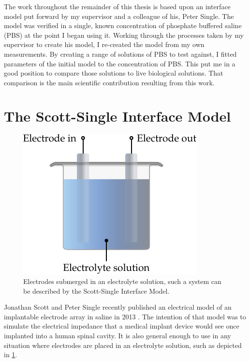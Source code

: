 
The work throughout the remainder of this thesis is based upon an interface model put forward by my supervisor and a colleague of his, Peter Single.
The model was verified in a single, known concentration of phosphate buffered saline (PBS) at the point I began using it.
Working through the processes taken by my supervisor to create his model, I re-created the model from my own measurements.
By creating a range of solutions of PBS to test against, I fitted parameters of the initial model to the concentration of PBS.
This put me in a good position to compare those solutions to live biological solutions.
That comparison is the main scientific contribution resulting from this work.

\section{The Scott-Single Interface Model}

  \begin{figure}
    \centering
    \includegraphics{content/pt2/07-InterfaceModel/graphics/electrode-electrolyte}
    \caption{\label{fig:electrode-electrolyte}Electrodes submerged in an electrolyte solution, such a system can be described by the Scott-Single Interface Model.}
  \end{figure}

  Jonathan Scott and Peter Single recently published an electrical model of an implantable electrode array in saline in 2013 \cite{ScottSingle2013}.
  The intention of that model was to simulate the electrical impedance that a medical implant device would see once implanted into a human spinal cavity.
  It is also general enough to use in any situation where electrodes are placed in an electrolyte solution, such as depicted in \cref{fig:electrode-electrolyte}.

